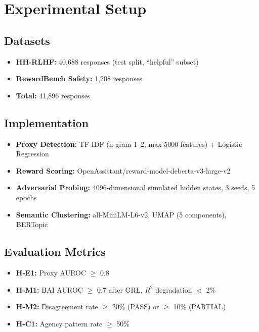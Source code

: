 \section{Experimental Setup}

\subsection{Datasets}

\begin{itemize}
    \item \textbf{HH-RLHF:} 40,688 responses (test split, ``helpful'' subset)
    \item \textbf{RewardBench Safety:} 1,208 responses
    \item \textbf{Total:} 41,896 responses
\end{itemize}

\subsection{Implementation}

\begin{itemize}
    \item \textbf{Proxy Detection:} TF-IDF (n-gram 1--2, max 5000 features) + Logistic Regression
    \item \textbf{Reward Scoring:} OpenAssistant/reward-model-deberta-v3-large-v2
    \item \textbf{Adversarial Probing:} 4096-dimensional simulated hidden states, 3 seeds, 5 epochs
    \item \textbf{Semantic Clustering:} all-MiniLM-L6-v2, UMAP (5 components), BERTopic
\end{itemize}

\subsection{Evaluation Metrics}

\begin{itemize}
    \item \textbf{H-E1:} Proxy AUROC $\geq$ 0.8
    \item \textbf{H-M1:} BAI AUROC $\geq$ 0.7 after GRL, $R^2$ degradation $<$ 2\%
    \item \textbf{H-M2:} Disagreement rate $\geq$ 20\% (PASS) or $\geq$ 10\% (PARTIAL)
    \item \textbf{H-C1:} Agency pattern rate $\geq$ 50\%
\end{itemize}
